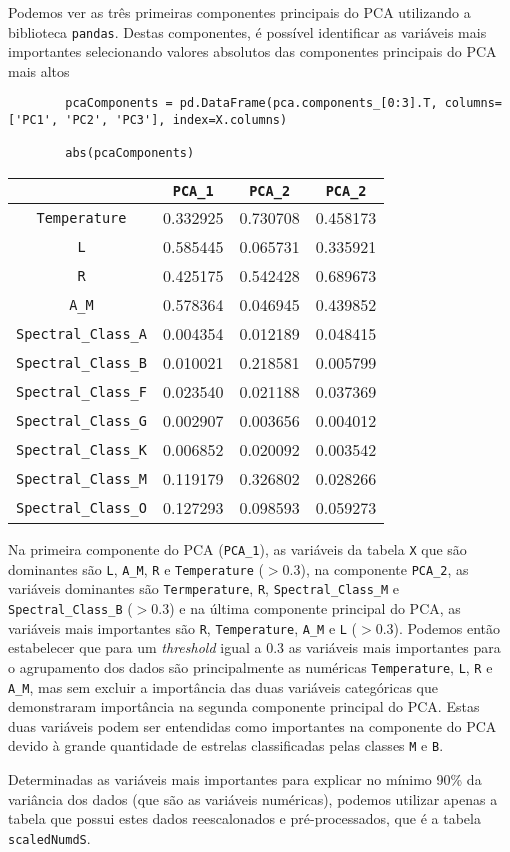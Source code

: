 

Podemos ver as três primeiras componentes principais do PCA utilizando a biblioteca \verb|pandas|. Destas componentes, é possível identificar as variáveis mais importantes selecionando valores absolutos das componentes principais do PCA mais altos
\begin{longlisting}
    \begin{verbatim}
        pcaComponents = pd.DataFrame(pca.components_[0:3].T, columns=['PC1', 'PC2', 'PC3'], index=X.columns)

        abs(pcaComponents)
    \end{verbatim}
\end{longlisting}
\begin{table}[H]
    \centering
    \begin{tabular}{cccc}
        \toprule
        & \verb|PCA_1| & \verb|PCA_2| & \verb|PCA_2| \\ 
        \midrule
        \verb|Temperature| & 0.332925 & 0.730708 & 0.458173 \\
        \verb|L| & 0.585445 & 0.065731 & 0.335921 \\
        \verb|R| & 0.425175 & 0.542428 & 0.689673 \\
        \verb|A_M| & 0.578364 & 0.046945 & 0.439852 \\
        \verb|Spectral_Class_A| & 0.004354 & 0.012189 & 0.048415 \\
        \verb|Spectral_Class_B| & 0.010021 & 0.218581 & 0.005799 \\
        \verb|Spectral_Class_F| & 0.023540 & 0.021188 & 0.037369 \\
        \verb|Spectral_Class_G| & 0.002907 & 0.003656 & 0.004012 \\
        \verb|Spectral_Class_K| & 0.006852 & 0.020092 & 0.003542 \\
        \verb|Spectral_Class_M| & 0.119179 & 0.326802 & 0.028266 \\
        \verb|Spectral_Class_O| & 0.127293 & 0.098593 & 0.059273 \\
        \bottomrule
    \end{tabular}
\end{table}

Na primeira componente do PCA (\verb|PCA_1|), as variáveis da tabela \verb|X| que são dominantes são \verb|L|, \verb|A_M|, \verb|R| e \verb|Temperature| ($>0.3$), na componente \verb|PCA_2|, as variáveis dominantes são \verb|Termperature|, \verb|R|, \verb|Spectral_Class_M| e \verb|Spectral_Class_B| ($>0.3$) e na última componente principal do PCA, as variáveis mais importantes são \verb|R|, \verb|Temperature|, \verb|A_M| e \verb|L| ($>0.3$). Podemos então estabelecer que para um \textit{threshold} igual a $0.3$ as variáveis mais importantes para o agrupamento dos dados são principalmente as numéricas \verb|Temperature|, \verb|L|, \verb|R| e \verb|A_M|, mas sem excluir a importância das duas variáveis categóricas que demonstraram importância na segunda componente principal do PCA. Estas duas variáveis podem ser entendidas como importantes na componente do PCA devido à grande quantidade de estrelas classificadas pelas classes \verb|M| e \verb|B|.

Determinadas as variáveis mais importantes para explicar no mínimo 90\% da variância dos dados (que são as variáveis numéricas), podemos utilizar apenas a tabela que possui estes dados reescalonados e pré-processados, que é a tabela \verb|scaledNumdS|.